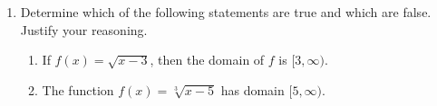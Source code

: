 \documentclass[12pt]{article}
\newenvironment{solution}{\begin{proof}[Solution]}{\end{proof}}
\begin{document}
\begin{enumerate}
\begin{enumerate}
\begin{solution}
					To find the zeroes, we need to solve the equation $\dfrac{(x-1)^{3/2}-8}{x^2-6x+5}=0$, i.e., $(x-1)^{3/2}-8=0$.
					\begin{align*}
						(x-1)^{3/2}-8=0&\iff (x-1)^{3/2}=8\\
						&\iff x-1=8^{2/3}\\
						&\iff x-1=4\\
						&\iff x=5
					\end{align*}
					But 5 is not in the domain of the function, so the function has no zeroes.
				\end{solution}
			\end{enumerate}
			
			\item Determine which of the following statements are true and which are false. Justify your reasoning.
			\begin{enumerate}
			
			\item If $f(x)=\sqrt{x-3}$, then the domain of $f$ is $[3,\infty)$.
			
			\item The function $f(x)=\sqrt[3]{x-5}$ has domain $[5,\infty)$.
			
		
			
			\end{enumerate}
			
		\end{enumerate}
		
		
		
			
\end{document}
